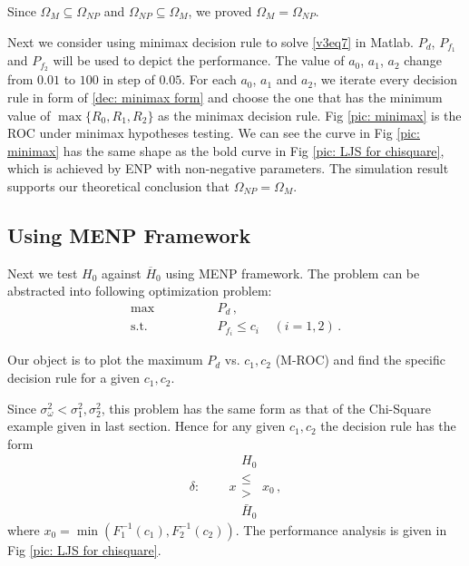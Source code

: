 \documentclass[12pt,journal,a4paper,twoside,onecolumn]{IEEEtran}
\begin{document}
\begin{spacing}{2.5}
Since $\Omega_{M} \subseteq \Omega_{NP}$ and $\Omega_{NP} \subseteq \Omega_{M}$, we proved $\Omega_M = \Omega_{NP}$.

Next we consider using minimax decision rule to solve \eqref{v3eq7} in Matlab. $P_d$, $P_{f_1}$ and $P_{f_2}$ will be used to depict the performance. 
 The value of $a_0$, $a_1$, $a_2$ change from $0.01$ to $100$ in step of $0.05$. For each $a_0$, $a_1$ and $a_2$, we iterate every decision rule in form of \eqref{dec: minimax form} and choose the one that has the minimum value of $\max\{R_0, R_1, R_2\}$ as the minimax decision rule. Fig \ref{pic: minimax} is the ROC under minimax hypotheses testing.
We can see the curve in Fig \ref{pic: minimax} has the same shape as the bold curve in Fig \ref{pic: LJS for chisquare}, which is achieved by ENP with non-negative parameters. The simulation result supports our theoretical conclusion that $\Omega_{NP} = \Omega_{M}$.
\subsection{Using MENP Framework}

Next we test $H_0$ against $\overline{H}_0$ using MENP framework. The problem can be abstracted into following optimization problem:
\begin{equation}
  \label{equ: energy spectrum sensing}
  \begin{split}
  \max \;\;\;\;\;\;\;\;\;\;\;\;\;\;\; &P_d\,,\\
  \text{s.t.} \;\;\;\;\;\;\;\;\;\;\;\;\;\;\; &P_{f_i} \leq c_i\;\;\;\;(i = 1, 2)\,.
  \end{split}
\end{equation}

Our object is to plot the maximum $P_d$ vs. $c_1, c_2$ (M-ROC) and find the specific decision rule for a given $c_1, c_2$.

Since $\sigma_\omega^2 < \sigma_1^2, \sigma_2^2$, this problem has the same form as that of the Chi-Square example given in last section.
Hence for any given $c_1, c_2$ the decision rule has the form
\begin{equation}
\label{equ: decision rule for spectrum sensing}
\delta:\;\;\;\;\;\;\;\; x \substack{H_0 \\ \leq \\ > \\\bar{H}_0} x_0\,,
 \end{equation}
where $x_0 = \min(F_1^{-1}(c_1), F_2^{-1}(c_2))$.
The performance analysis is given in Fig \ref{pic: LJS for chisquare}. 


\end{spacing}
\end{document}
